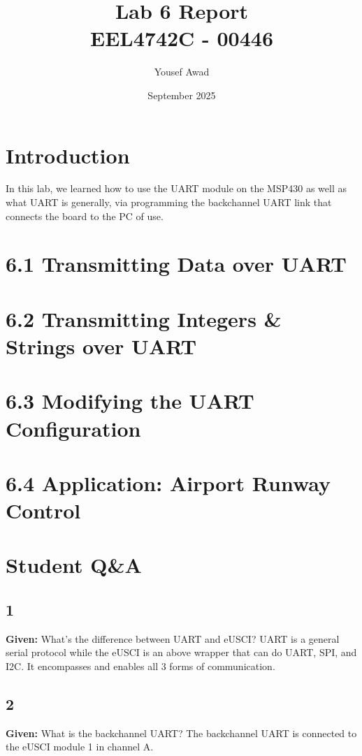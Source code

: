 \documentclass{article}
\title{Lab 6 Report \\ \large EEL4742C - 00446}
\author{Yousef Awad}
\date{September 2025}
\begin{document}
\maketitle
\tableofcontents
\newpage

\section{Introduction}
In this lab, we learned how to use the UART module on the MSP430 as well as what UART is generally, via programming the backchannel UART link that connects the board to the PC of use.

\section{6.1 Transmitting Data over UART}

\pagebreak
\section{6.2 Transmitting Integers \& Strings over UART}

\pagebreak
\section{6.3 Modifying the UART Configuration}

\pagebreak
\section{6.4 Application: Airport Runway Control}

\pagebreak
\section{Student Q\&A}
\subsection{1}
\textbf{Given:} What’s the difference between UART and eUSCI?
\newline
\newline
UART is a general serial protocol while the eUSCI is an above wrapper that can do UART, SPI, and I2C. It encompasses and enables all 3 forms of communication.

\subsection{2}
\textbf{Given:} What is the backchannel UART?
\newline
\newline
The backchannel UART is connected to the eUSCI module 1 in channel A.
\end{document}
